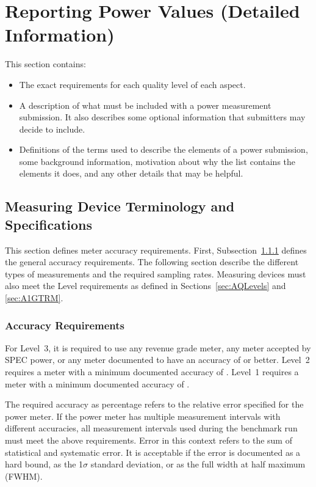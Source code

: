 \chapter{Reporting Power Values \normalsize{(Detailed Information)}}
\label{sec:reporting}

\noindent
This section contains:
\begin{itemize}
 \item The exact requirements for each quality level of each aspect.
 \item A description of what must be included with a power measurement submission.
       It also describes some optional information that submitters may decide to include.
 \item Definitions of the terms used to describe the elements of a power submission, some background information, motivation about why the list contains the elements it does, and any other details that may be helpful.
\end{itemize}
\wl

\section{Measuring Device Terminology and Specifications}
\label{sec:MDSpecs}
\label{sec:MDTerm}

\noindent
This section defines meter accuracy requirements.
First, Subsection~\ref{sec:accuracy} defines the general accuracy requirements.
The following section describe the different types of measurements and the required sampling rates. 
Measuring devices must also meet the Level requirements as defined in Sections~\ref{sec:AQLevels} and \ref{sec:A1GTRM}.
\wl

\subsection{Accuracy Requirements}
\label{sec:accuracy}

\noindent
For Level~3, it is required to use any revenue grade meter, any meter accepted by SPEC power, or any meter documented to have an accuracy of \SpecAccuracyLThree{} or better.
Level~2 requires a meter with a minimum documented accuracy of \SpecAccuracyLTwo{}.
Level~1 requires a meter with a minimum documented accuracy of \SpecAccuracyLOne{}.
\wl

\noindent
The required accuracy as percentage refers to the relative error specified for the power meter.
If the power meter has multiple measurement intervals with different accuracies, all measurement intervals used during the benchmark run must meet the above requirements.
Error in this context refers to the sum of statistical and systematic error.
It is acceptable if the error is documented as a hard bound, as the 1$\sigma$ standard deviation, or as the full width at half maximum (FWHM).
\wl

